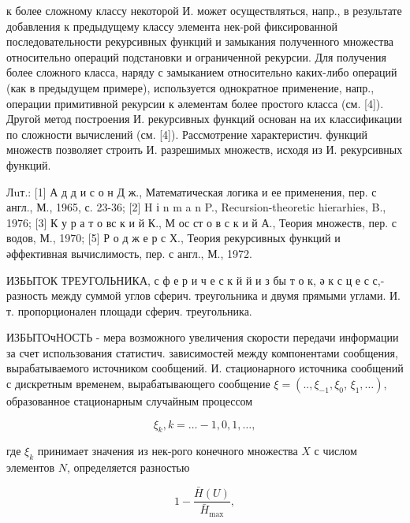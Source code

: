 \documentclass[10pt]{article}
\begin{document}
к более сложному классу некоторой И. может осуществляться, напр., в результате добавления к предыдущему классу элемента нек-рой фиксированной последовательности рекурсивных функций и замыкания полученного множества относительно операций подстановки и ограниченной рекурсии. Для получения более сложного класса, наряду с замыканием относительно каких-либо операций (как в предыдущем примере), используется однократное применение, напр., операции примитивной рекурсии к әлементам более простого класса (см. [4]). Другой метод построения И. рекурсивных функций основан на их классификации по сложности вычислений (см. [4]). Рассмотрение характеристич. функций множеств позволяет строить И. разрешимых множеств, исходя из И. рекурсивных функций.



Лuт.: [1] А д д и с о н Д ж., Математическая логика и ее применения, пер. с англ., М., 1965, с. 23-36; [2] H і $\mathrm{n}$ m a n P., Recursion-theoretic hierarhies, B., 1976; [3] К у р а т о вс к и й К., М ос ст о в с к и й А., Теория множеств, пер. с водов, М., 1970; [5] Р о д ж е р с Х., Теория рекурсивных функций и әффективная вычислимость, пер. с англ., М., 1972.



ИЗБЫТОК ТРЕУГОЛЬНИКА, с ф е р и ч е с к й й и з бы т о к, ә к с ц е с с,- разность между суммой углов сферич. треугольника и двумя прямыми углами. И. т. пропорционален площади сферич. треугольника.



ИЗБЫТОчНОСТЬ - мера возможного увеличения скорости передачи информации за счет использования статистич. зависимостей между компонентами сообщения, вырабатываемого источником сообщений. И. стационарного источника сообщений с дискретным временем, вырабатывающего сообщение $\xi=\left(. ., \xi_{-1}, \xi_{0}\right.$, $\left.\xi_{1}, \ldots\right)$, образованное стационарным случайным процессом



\[

\xi_{k}, k=\ldots-1,0,1, \ldots,

\]



где $\xi_{k}$ принимает значения из нек-рого конечного множества $X$ с числом элементов $N$, определяется разностью



\[

1-\frac{\bar{H}(U)}{\bar{H}_{\max }},

\]
\end{document}
